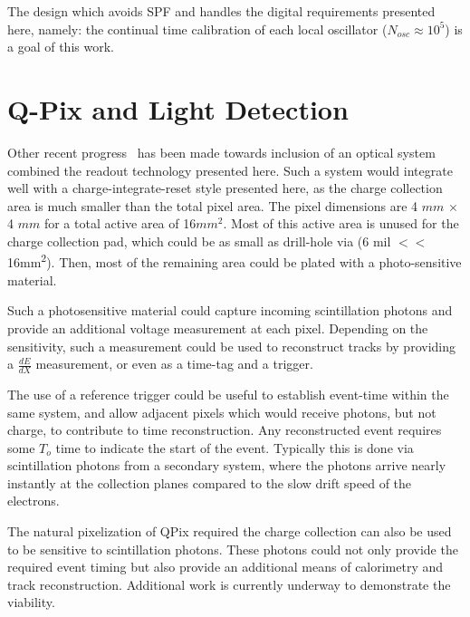 The design which avoids SPF and handles the digital requirements presented here, namely: the continual time calibration of each local oscillator ($N_{osc} \approx 10^{5}$) is a goal of this work.

\section{Q-Pix and Light Detection}

Other recent progress~\citep{https://doi.org/10.48550/arxiv.2207.11127} has been made towards inclusion of an optical system combined the readout technology presented here.
Such a system would integrate well with a charge-integrate-reset style presented here, as the charge collection area is much smaller than the total pixel area.
The pixel dimensions are 4 $\unit{mm}$ $\times$ 4 $\unit{mm} $ for a total active area of 16$\unit{mm^{2}}$.
Most of this active area is unused for the charge collection pad, which could be as small as drill-hole via (6 mil $<<$ 16\unit{mm^2}).
Then, most of the remaining area could be plated with a photo-sensitive material.

Such a photosensitive material could capture incoming scintillation photons and provide an additional voltage measurement at each pixel.
Depending on the sensitivity, such a measurement could be used to reconstruct tracks by providing a $\frac{dE}{dX}$ measurement, or even as a time-tag and a trigger.

The use of a reference trigger could be useful to establish event-time within the same system, and allow adjacent pixels which would receive photons, but not charge, to contribute to time reconstruction.
Any reconstructed event requires some $T_{o}$ time to indicate the start of the event.
Typically this is done via scintillation photons from a secondary system, where the photons arrive nearly instantly at the collection planes compared to the slow drift speed of the electrons.

The natural pixelization of QPix required the charge collection can also be used to be sensitive to scintillation photons.
These photons could not only provide the required event timing but also provide an additional means of calorimetry and track reconstruction.
Additional work is currently underway to demonstrate the viability.

